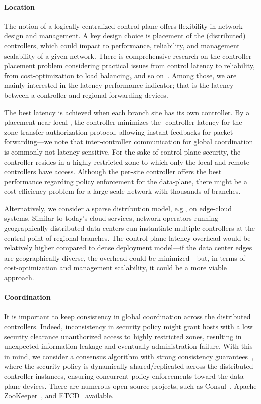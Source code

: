 \paragraph{Location}
The notion of a logically centralized control-plane offers flexibility in network design
and management. A key design choice is placement of the (distributed) controllers, which
could impact to performance, reliability, and management scalability of a given network.
There is comprehensive research on the controller placement problem considering practical
issues from control latency to reliability, from cost-optimization to load balancing, and so 
on~\cite{das2019survey,zhang2017role,he2019toward}. Among those, we are mainly interested in the 
latency performance indicator; that is the latency between a controller and regional forwarding 
devices. 

The best latency is achieved when each branch site has its own controller. By a placement 
near local \tps, the controller minimizes the \tp-controller latency for the zone 
transfer authorization protocol, allowing instant feedbacks for packet forwarding---we note
that inter-controller communication for global coordination is commonly not latency sensitive. 
For the sake of control-plane security, the controller resides in a highly restricted zone to 
which only the local \tps and remote controllers have access. Although the per-site controller
offers the best performance regarding policy enforcement for the data-plane, there might be a 
cost-efficiency problem for a large-scale network with thousands of branches.

Alternatively, we consider a sparse distribution model, e.g., on edge-cloud systems.
Similar to today's cloud services, network operators running geographically distributed
data centers can instantiate multiple controllers at the central point of regional branches. 
The control-plane latency overhead would be relatively higher compared to dense deployment 
model---if the data center edges are geographically diverse, the overhead could be 
minimized---but, in terms of cost-optimization and management scalability, it could
be a more viable approach.

\paragraph{Coordination}
It is important to keep consistency in global coordination across the distributed controllers.
Indeed, inconsistency in security policy might grant hosts with a low security 
clearance unauthorized access to highly restricted zones, resulting in unexpected information
leakage and eventually administration failure. With this in mind, we consider a consensus
algorithm with strong consistency guarantees~\cite{panda2013cap,phemius2014disco,shi2014giraffe}, 
where the security policy is dynamically shared/replicated across the distributed controller
instances, ensuring concurrent policy enforcements toward the data-plane devices. There
are numerous open-source projects, such as Consul~\cite{hashicorpconsul}, Apache 
ZooKeeper~\cite{apachezookeeper}, and ETCD~\cite{etcdio} available.

